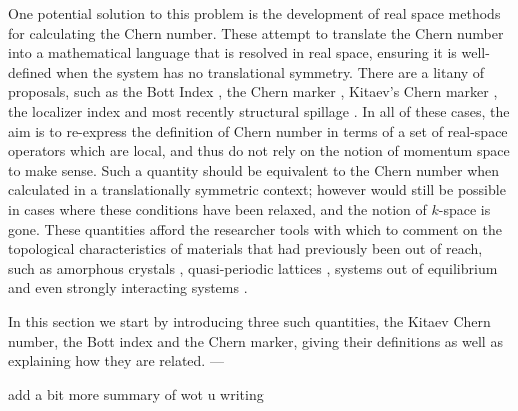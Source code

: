 One potential solution to this problem is the development of real space methods for calculating the Chern number. These attempt to translate the Chern number into a mathematical language that is resolved in real space, ensuring it is well-defined when the system has no translational symmetry. There are a litany of proposals, such as the Bott Index \cite{toniolo_equivalence_2017,toniolo_time-dependent_2018,hastings_almost_2010, toniolo_bott_2022}, the Chern marker \cite{bianco_mapping_2011,bianco_orbital_2013}, Kitaev's Chern marker \cite{kitaev_anyons_2006,mitchell_amorphous_2018, fan2023generalized}, the localizer index \cite{loring_guide_2019} and most recently structural spillage \cite{munoz-segovia_structural_2023}. In all of these cases, the aim is to re-express the definition of Chern number in terms of a set of real-space operators which are local, and thus do not rely on the notion of momentum space to make sense. Such a quantity should be equivalent to the Chern number when calculated in a translationally symmetric context; however would still be possible in cases where these conditions have been relaxed, and the notion of $k$-space is gone. These quantities afford the researcher tools with which to comment on the topological characteristics of materials that had previously been out of reach, such as amorphous crystals \cite{agarwala_topological_2017}, quasi-periodic lattices \cite{huang_theory_2018}, systems out of equilibrium \cite{caio_topological_2019,toniolo_time-dependent_2018,golovanova_truly_2021,markov_locality_2023} and even strongly interacting systems \cite{markov_local_2021}.



\begin{shaded}
    In this section we start by introducing three such quantities, the Kitaev Chern number, the Bott index and the Chern marker, giving their definitions as well as explaining how they are related.
     --- 

    add a bit more summary of wot u writing
\end{shaded}